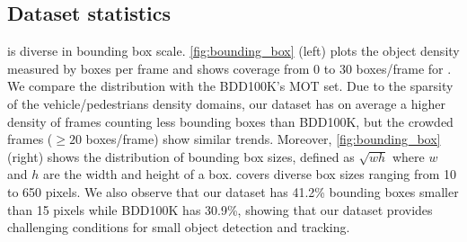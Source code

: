 \subsection{Dataset statistics} \label{ssec:dataset_statistics}
\thedataset{} is diverse in bounding box scale. \autoref{fig:bounding_box} (left) plots the object density measured by boxes per frame and shows coverage from 0 to 30 boxes/frame for \thedataset{}. We compare the distribution with the BDD100K's MOT set. Due to the sparsity of the vehicle/pedestrians density domains, our dataset has on average a higher density of frames counting less bounding boxes than BDD100K, but the crowded frames ($\geq20$ boxes/frame) show similar trends. Moreover, \autoref{fig:bounding_box} (right) shows the distribution of bounding box sizes, defined as $\sqrt{wh}$ where $w$ and $h$ are the width and height of a box. \thedataset{} covers diverse box sizes ranging from 10 to 650 pixels. We also observe that our dataset has 41.2\% bounding boxes smaller than 15 pixels while BDD100K has 30.9\%, showing that our dataset provides challenging conditions for small object detection and tracking.

